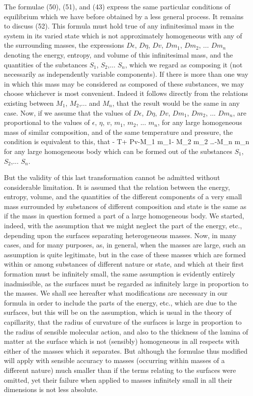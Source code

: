 \documentclass[12pt]{article}
\begin{document}
The formulae (50), (51), and (43) express the same particular conditions of equilibrium which we have before obtained by a less general process. It remains to discuss (52). This formula must hold true of any infinitesimal mass in the system in its varied state which is not approximately homogeneous with any of the surrounding masses, the expressions $D\epsilon$, $D\eta$, $Dv$, $Dm_1$, $Dm_2$, ... $D m_n$ denoting the energy, entropy, and volume of this infinitesimal mass, and the quantities of the substances $S_1$, $S_2$,... $S_n$, which we regard as composing it (not necessarily as independently variable components). If there is more than one way in which this mass may be considered as composed of these substances, we may choose whichever is most convenient. Indeed it follows directly from the relations existing between $M_1$, $M_2$,... and $M_n$, that the result would be the same in any case. Now, if we assume that the values of $D\epsilon$, $D\eta$, $Dv$, $Dm_1$, $Dm_2$, ... $D m_n$, are proportional to the values of $\epsilon$, $\eta$, $v$, $m_1$, $m_2$, ... $m_n$, for any large homogeneous mass of similar composition, and of the same temperature and pressure, the condition is equivalent to this, that
\eqs \epsilon- T\eta + Pv-M_1 m_1- M_2 m_2 \dots -M_n m_n       \label{53}\eqe
for any large homogeneous body which can be formed out of the substances $S_1$, $S_2$,... $S_n$.


But the validity of this last transformation cannot be admitted without considerable limitation. It is assumed that the relation between the energy, entropy, volume, and the quantities of the different components of a very small mass surrounded by substances of different composition and state is the same as if the mass in question formed a part of a large homogeneous body. We started, indeed, with the assumption that we might neglect the part of the energy, etc., depending upon the surfaces separating heterogeneous masses. Now, in many cases, and for many purposes, as, in general, when the masses are large, such an assumption is quite legitimate, but in the case of these masses which are formed within or among substances of different nature or state, and which at their first formation must be infinitely small, the same assumption is evidently entirely inadmissible, as the surfaces must be regarded as infinitely large in proportion to the masses. We shall see hereafter what modifications are necessary in our formula in order to include the parts of the energy, etc., which are due to the surfaces, but this will be on the assumption, which is usual in the theory of capillarity, that the radius of curvature of the surfaces is large in proportion to the radius of sensible molecular action, and also to the thickness of the lamina of matter at the surface which is not (sensibly) homogeneous in all respects with either of the masses which it separates. But although the formulae thus modified will apply with sensible accuracy to masses (occurring within masses of a different nature) much smaller than if the terms relating to the surfaces were omitted, yet their failure when applied to masses infinitely small in all their dimensions is not less absolute.
\end{document}
